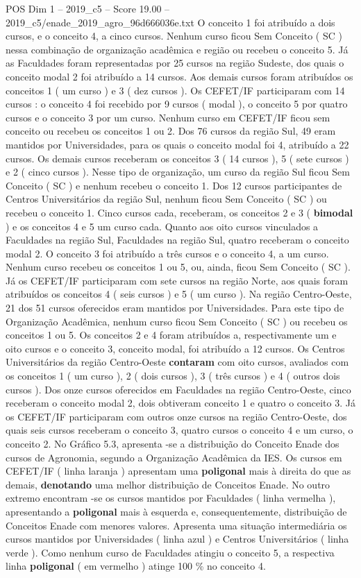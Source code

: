 \begin{textsample}{POS Dim 1 – 2019\_c5 – Score 19.00 – 2019\_c5/enade\_2019\_agro\_96d666036e.txt}
O conceito 1 foi atribuído a dois cursos, e o conceito 4, a cinco cursos.
Nenhum curso ficou Sem Conceito ( SC ) nessa combinação de organização acadêmica e região ou recebeu o conceito 5.
Já as Faculdades foram representadas por 25 cursos na região Sudeste, dos quais o conceito modal 2 foi atribuído a 14 cursos.
Aos demais cursos foram atribuídos os conceitos 1 ( um curso ) e 3 ( dez cursos ).
Os CEFET/IF participaram com 14 cursos : o conceito 4 foi recebido por 9 cursos ( modal ), o conceito 5 por quatro cursos e o conceito 3 por um curso.
Nenhum curso em CEFET/IF ficou sem conceito ou recebeu os conceitos 1 ou 2.
Dos 76 cursos da região Sul, 49 eram mantidos por Universidades, para os quais o conceito modal foi 4, atribuído a 22 cursos.
Os demais cursos receberam os conceitos 3 ( 14 cursos ), 5 ( sete cursos ) e 2 ( cinco cursos ).
Nesse tipo de organização, um curso da região Sul ficou Sem Conceito ( SC ) e nenhum recebeu o conceito 1.
Dos 12 cursos participantes de Centros Universitários da região Sul, nenhum ficou Sem Conceito ( SC ) ou recebeu o conceito 1.
Cinco cursos cada, receberam, os conceitos 2 e 3 ( \textbf{bimodal} ) e os conceitos 4 e 5 um curso cada.
Quanto aos oito cursos vinculados a Faculdades na região Sul, Faculdades na região Sul, quatro receberam o conceito modal 2.
O conceito 3 foi atribuído a três cursos e o conceito 4, a um curso.
Nenhum curso recebeu os conceitos 1 ou 5, ou, ainda, ficou Sem Conceito ( SC ).
Já os CEFET/IF participaram com sete cursos na região Norte, aos quais foram atribuídos os conceitos 4 ( seis cursos ) e 5 ( um curso ).
Na região Centro-Oeste, 21 dos 51 cursos oferecidos eram mantidos por Universidades.
Para este tipo de Organização Acadêmica, nenhum curso ficou Sem Conceito ( SC ) ou recebeu os conceitos 1 ou 5.
Os conceitos 2 e 4 foram atribuídos a, respectivamente um e oito cursos e o conceito 3, conceito modal, foi atribuído a 12 cursos.
Os Centros Universitários da região Centro-Oeste \textbf{contaram} com oito cursos, avaliados com os conceitos 1 ( um curso ), 2 ( dois cursos ), 3 ( três cursos ) e 4 ( outros dois cursos ).
Dos onze cursos oferecidos em Faculdades na região Centro-Oeste, cinco receberam o conceito modal 2, dois obtiveram conceito 1 e quatro o conceito 3.
Já os CEFET/IF participaram com outros onze cursos na região Centro-Oeste, dos quais seis cursos receberam o conceito 3, quatro cursos o conceito 4 e um curso, o conceito 2.
No Gráfico 5.3, apresenta -se a distribuição do Conceito Enade dos cursos de Agronomia, segundo a Organização Acadêmica da IES.
Os cursos em CEFET/IF ( linha laranja ) apresentam uma \textbf{poligonal} mais à direita do que as demais, \textbf{denotando} uma melhor distribuição de Conceitos Enade.
No outro extremo encontram -se os cursos mantidos por Faculdades ( linha vermelha ), apresentando a \textbf{poligonal} mais à esquerda e, consequentemente, distribuição de Conceitos Enade com menores valores.
Apresenta uma situação intermediária os cursos mantidos por Universidades ( linha azul ) e Centros Universitários ( linha verde ).
Como nenhum curso de Faculdades atingiu o conceito 5, a respectiva linha \textbf{poligonal} ( em vermelho ) atinge 100 \% no conceito 4.


\end{textsample}
